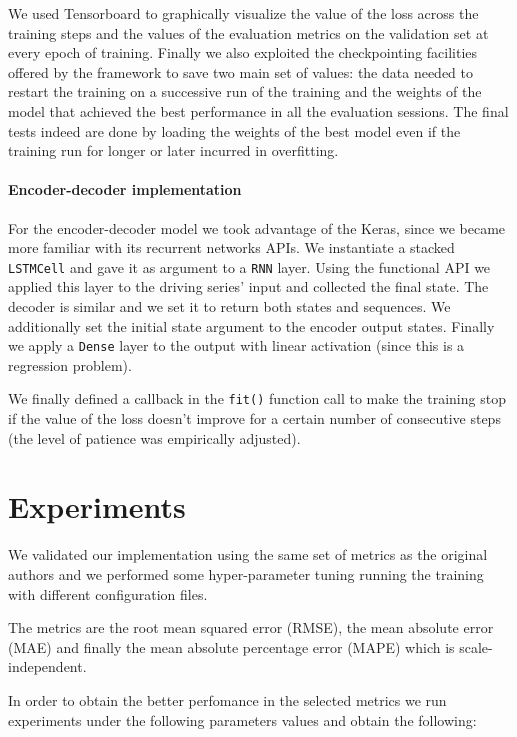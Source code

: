 \documentclass{article}
\begin{document}
We used Tensorboard to graphically visualize the value of the loss across 
the training steps and the values of the evaluation metrics on the validation set 
at every epoch of training. Finally we also exploited the checkpointing facilities
offered by the framework to save two main set of values: the data needed to 
restart the training on a successive run of the training and the weights of the 
model that achieved the best performance in all the evaluation sessions. The final
tests indeed are done by loading the weights of the best model even if the 
training run for longer or later incurred in overfitting.

\paragraph{Encoder-decoder implementation}

For the encoder-decoder model we took advantage of the Keras, since we became more
familiar with its recurrent networks APIs. We instantiate a stacked 
\texttt{LSTMCell} and gave it as argument to a \texttt{RNN} layer. Using the 
functional API we applied this layer to the driving series' input and collected
the final state. The decoder is similar and we set it to return both states and 
sequences. We additionally set the initial state argument to the encoder output 
states. Finally we apply a \texttt{Dense} layer to the output with linear 
activation (since this is a regression problem).

We finally defined a callback in the \texttt{fit()} function call to make the
training stop if the value of the loss doesn't improve for a certain number of 
consecutive steps (the level of patience was empirically adjusted).

\section{Experiments}

We validated our implementation using the same set of metrics as the original 
authors and we performed some hyper-parameter tuning running the training with
different configuration files.

The metrics are the root mean squared error (RMSE), the mean absolute error (MAE) 
and finally the mean absolute percentage error (MAPE) which is scale-independent.

In order to obtain the better perfomance in the selected metrics we run
experiments under the following parameters values and obtain the following:
\end{document}
